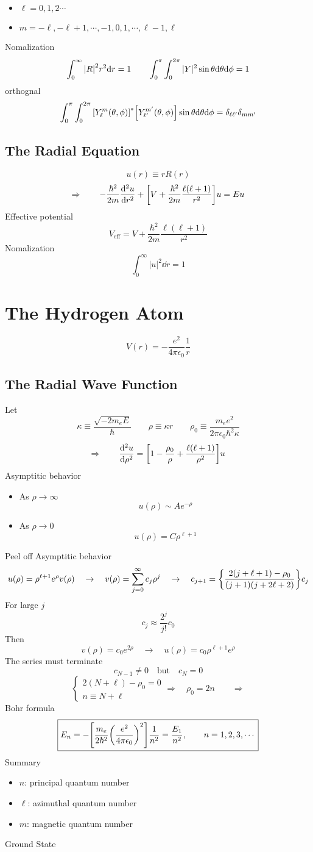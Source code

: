 \begin{itemize}
       \item \(\ell = 0,1,2\cdots\)
       \item \(m = -\ell,-\ell+1,\cdots,-1,0,1,\cdots,\ell-1,\ell\)
\end{itemize}
Nomalization
\[\int_0^\infty\qty|R|^2r^2\dd r=1\qquad\int_0^\pi\int_0^{2\pi}|Y|^2\sin\theta\dd\theta\dd\phi=1\]
orthognal
\[\int_0^\pi\int_0^{2\pi}\qty[Y_\ell^m(\theta,\phi)]^*\qty[Y_{\ell'}^{m'}(\theta,\phi)]\sin\theta\dd\theta\dd\phi=\delta_{\ell\ell'}\delta_{mm'}\]
\subsection{The Radial Equation}
\[u(r) \equiv rR(r)\]
\[\Rightarrow\qquad
  -\frac{\hbar^2}{2m}\dv[2]{u}{r}+\qty[V+\frac{\hbar^2}{2m}\frac{\ell(\ell+1)}{r^2}]u = Eu\]
Effective potential
\[V_{\text{eff}} = V+\frac{\hbar^2}{2m}\frac{\ell(\ell+1)}{r^2}\]
Nomalization
\[\int_0^\infty|u|^2\dd r=1\]
\section{The Hydrogen Atom}
\[V(r) = -\frac{e^2}{4\pi\epsilon_0}\frac{1}{r}\]
\subsection{The Radial Wave Function}
Let \[\kappa\equiv\frac{\sqrt{-2m_eE}}{\hbar}
\qquad \rho\equiv\kappa r\qquad\rho_0\equiv\frac{m_ee^2}{2\pi\epsilon_0\hbar^2\kappa}\]
\[\Rightarrow\qquad \dv[2]{u}{\rho} = \qty[1-\frac{\rho_0}{\rho}+\frac{\ell(\ell+1)}{\rho^2}]u\]
Asymptitic behavior
\begin{itemize}
       \item As \(\rho\rightarrow\infty\)  \[u(\rho)\sim Ae^{-\rho}\]
       \item As \(\rho\rightarrow 0\) \[u(\rho) = C\rho^{\ell+1}\]
\end{itemize}
Peel off Asymptitic behavior
\[u(\rho)=\rho^{\ell+1}e^{\rho}v(\rho) \quad\rightarrow\quad v(\rho) = \sum_{j=0}^\infty c_j\rho^j
\quad\rightarrow\quad c_{j+1} = \qty{\frac{2(j+\ell+1)-\rho_0}{(j+1)(j+2\ell+2)}}c_j\]
For large \(j\) 
\[c_j\approx\frac{2^j}{j!}c_0\]
Then
\[v(\rho)=c_0e^{2\rho}\quad\rightarrow\quad u(\rho) = c_0\rho^{\ell+1}e^\rho\]
The series must terminate
\[c_{N-1}\neq 0 \quad \text{but}\quad c_N=0\]
\[\begin{cases}
       2(N+\ell)-\rho_0 =0\\
       n\equiv N+\ell
\end{cases}\Rightarrow\quad\rho_0=2n\qquad\Rightarrow\]
Bohr formula
$${\boxed{  E_n=-\qty[\frac{m_e}{2\hbar^2}\qty(\frac{e^2}{4\pi\epsilon_0})^2]\frac{1}{n^2} = \frac{E_1}{n^2} ,\qquad n=1,2,3,\cdots}}$$
Summary
\begin{itemize}
       \item \(n\): principal quantum number
       \item \(\ell\): azimuthal quantum number
       \item \(m\): magnetic quantum number
\end{itemize}
Ground State


